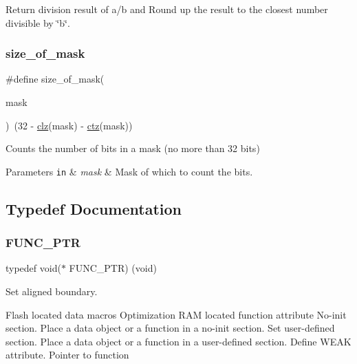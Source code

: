Return division result of a/b and Round up the result to the closest number divisible by \char`\"{}b\char`\"{}. 

\mbox{\label{group__doc__driver__hal__utils__macro_gacb24f277663a5c87482fbcdbef5f2bd2}} 
\subsubsection{\texorpdfstring{size\+\_\+of\+\_\+mask}{size\_of\_mask}}
{\footnotesize\ttfamily \#define size\+\_\+of\+\_\+mask(\begin{DoxyParamCaption}\item[{}]{mask }\end{DoxyParamCaption})~(32 -\/ \hyperlink{group__doc__driver__hal__utils__macro_ga004f88903a09b9c23017e697eaf5a845}{clz}(mask) -\/ \hyperlink{group__doc__driver__hal__utils__macro_gab069bfec305db5213465d3b689836404}{ctz}(mask))}



Counts the number of bits in a mask (no more than 32 bits) 


\begin{DoxyParams}[1]{Parameters}
\mbox{\tt in}  & {\em mask} & Mask of which to count the bits. \\
\hline
\end{DoxyParams}


\subsection{Typedef Documentation}
\mbox{\label{group__doc__driver__hal__utils__macro_gae40b38bc5f5a5bd452bdd59c67d9a9cf}} 
\subsubsection{\texorpdfstring{F\+U\+N\+C\+\_\+\+P\+TR}{FUNC\_PTR}}
{\footnotesize\ttfamily typedef void($\ast$ F\+U\+N\+C\+\_\+\+P\+TR) (void)}



Set aligned boundary. 

Flash located data macros Optimization R\+AM located function attribute No-\/init section. Place a data object or a function in a no-\/init section. Set user-\/defined section. Place a data object or a function in a user-\/defined section. Define W\+E\+AK attribute. Pointer to function 